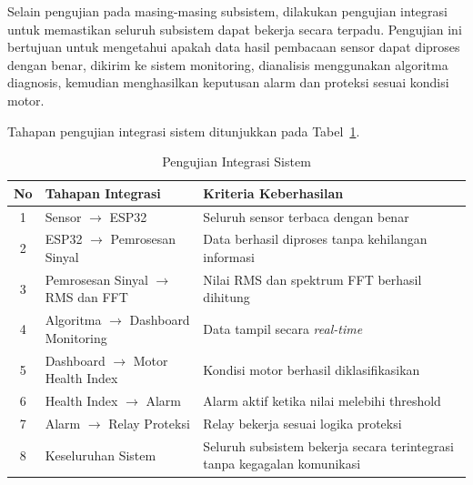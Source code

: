 \documentclass{elsinta}
\begin{document}
Selain pengujian pada masing-masing subsistem, dilakukan pengujian integrasi untuk memastikan seluruh subsistem dapat bekerja secara terpadu. Pengujian ini bertujuan untuk mengetahui apakah data hasil pembacaan sensor dapat diproses dengan benar, dikirim ke sistem monitoring, dianalisis menggunakan algoritma diagnosis, kemudian menghasilkan keputusan alarm dan proteksi sesuai kondisi motor.

Tahapan pengujian integrasi sistem ditunjukkan pada Tabel~\ref{tab:integrasi_sistem}.

\begin{table}[H]
\centering
\caption{Pengujian Integrasi Sistem}
\label{tab:integrasi_sistem}

\begin{tabular}{|c|p{6cm}|p{7cm}|}
\hline
\textbf{No} &
\centering\textbf{Tahapan Integrasi} &
\centering\arraybackslash\textbf{Kriteria Keberhasilan}\\
\hline

1 &
Sensor $\rightarrow$ ESP32 &
Seluruh sensor terbaca dengan benar\\
\hline

2 &
ESP32 $\rightarrow$ Pemrosesan Sinyal &
Data berhasil diproses tanpa kehilangan informasi\\
\hline

3 &
Pemrosesan Sinyal $\rightarrow$ RMS dan FFT &
Nilai RMS dan spektrum FFT berhasil dihitung\\
\hline

4 &
Algoritma $\rightarrow$ Dashboard Monitoring &
Data tampil secara \textit{real-time}\\
\hline

5 &
Dashboard $\rightarrow$ Motor Health Index &
Kondisi motor berhasil diklasifikasikan\\
\hline

6 &
Health Index $\rightarrow$ Alarm &
Alarm aktif ketika nilai melebihi threshold\\
\hline

7 &
Alarm $\rightarrow$ Relay Proteksi &
Relay bekerja sesuai logika proteksi\\
\hline

8 &
Keseluruhan Sistem &
Seluruh subsistem bekerja secara terintegrasi tanpa kegagalan komunikasi\\
\hline

\end{tabular}
\end{table}
\end{document}
